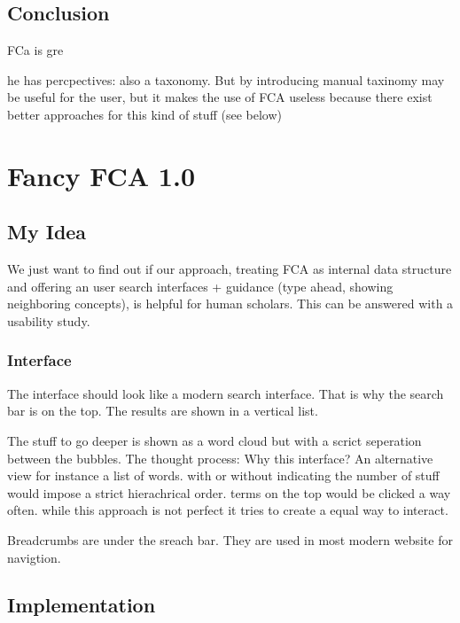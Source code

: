 \documentclass[11pt]{report}
\begin{document}
\section{Conclusion}

FCa is gre

 he has percpectives: also a taxonomy. But by introducing  manual taxinomy may be useful for the user, but it makes the use of FCA useless because there exist better approaches for this kind of stuff (see below)











\chapter{Fancy FCA 1.0}

\section{My Idea}

We just want to find out if our approach, treating FCA as internal data structure and offering an user search interfaces + guidance (type ahead, showing neighboring concepts), is helpful for human scholars. This can be answered with a usability study.

\subsection{Interface}

The interface should look like a modern search interface. That is why the search bar is on the top. The results are shown in a vertical list. 

The stuff to go deeper is shown as a word cloud but with a scrict seperation between the bubbles. The thought process: Why this interface? An alternative view for instance a list of words. with or without indicating the number of stuff would impose a strict hierachrical order. terms on the top would be clicked a way often. while this approach is not perfect it tries to create a equal way to interact.

Breadcrumbs are under the sreach bar. They are used in most modern website for navigtion.

\section{Implementation}
\end{document}
